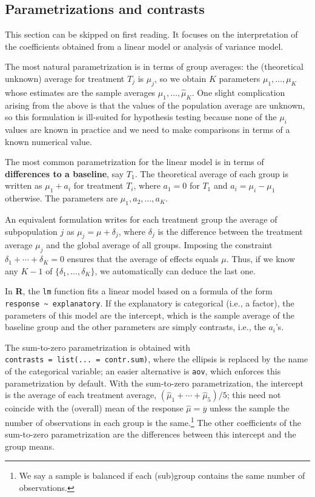 \documentclass[
  11pt,
  letterpaper,
]{scrbook}
\theoremstyle{definition}
\theoremstyle{remark}
\begin{document}
\hypertarget{parametrizations-and-contrasts}{%
\subsection{Parametrizations and
contrasts}\label{parametrizations-and-contrasts}}

This section can be skipped on first reading. It focuses on the
interpretation of the coefficients obtained from a linear model or
analysis of variance model.

The most natural parametrization is in terms of group averages: the
(theoretical unknown) average for treatment \(T_j\) is \(\mu_j\), so we
obtain \(K\) parameters \(\mu_1, \ldots, \mu_K\) whose estimates are the
sample averages \(\widehat{\mu}_1, \ldots, \widehat{\mu}_K\). One slight
complication arising from the above is that the values of the population
average are unknown, so this formulation is ill-suited for hypothesis
testing because none of the \(\mu_i\) values are known in practice and
we need to make comparisons in terms of a known numerical value.

The most common parametrization for the linear model is in terms of
\textbf{differences to a baseline}, say \(T_1\). The theoretical average
of each group is written as \(\mu_1 + a_i\) for treatment \(T_i\), where
\(a_1=0\) for \(T_1\) and \(a_i = \mu_i-\mu_1\) otherwise. The
parameters are \(\mu_1, a_2, \ldots, a_K\).

An equivalent formulation writes for each treatment group the average of
subpopulation \(j\) as \(\mu_j = \mu + \delta_j\), where \(\delta_j\) is
the difference between the treatment average \(\mu_j\) and the global
average of all groups. Imposing the constraint
\(\delta_1 + \cdots + \delta_K=0\) ensures that the average of effects
equals \(\mu\). Thus, if we know any \(K-1\) of
\(\{\delta_1, \ldots, \delta_K\}\), we automatically can deduce the last
one.

In \textbf{R}, the \texttt{lm} function fits a linear model based on a
formula of the form \texttt{response\ \textasciitilde{}\ explanatory}.
If the explanatory is categorical (i.e., a factor), the parameters of
this model are the intercept, which is the sample average of the
baseline group and the other parameters are simply contrasts, i.e., the
\(a_i\)'s.

The sum-to-zero parametrization is obtained with
\texttt{contrasts\ =\ list(...\ =\ contr.sum)}, where the ellipsis is
replaced by the name of the categorical variable; an easier alternative
is \texttt{aov}, which enforces this parametrization by default. With
the sum-to-zero parametrization, the intercept is the average of each
treatment average, \((\widehat{\mu}_1 + \cdots + \widehat{\mu}_5)/5\);
this need not coincide with the (overall) mean of the response
\(\widehat{\mu} = \overline{y}\) unless the sample the number of
observations in each group is the same.\footnote{We say a sample is
  balanced if each (sub)group contains the same number of observations.}
The other coefficients of the sum-to-zero parametrization are the
differences between this intercept and the group means.
\end{document}
